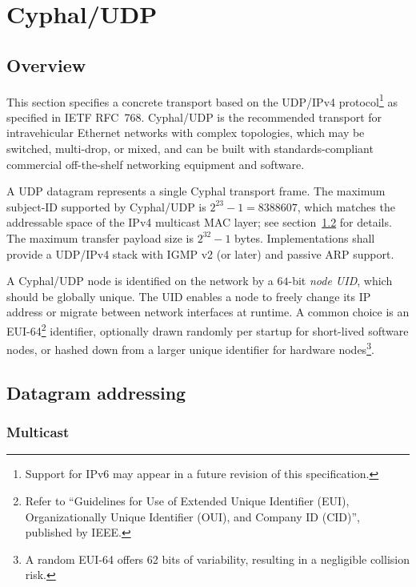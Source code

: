 \section{Cyphal/UDP}\label{sec:transport_udp}

\subsection{Overview}

This section specifies a concrete transport based on the UDP/IPv4 protocol\footnote{%
    Support for IPv6 may appear in a future revision of this specification.
} as specified in IETF RFC~768.
Cyphal/UDP is the recommended transport for intravehicular Ethernet networks with complex topologies,
which may be switched, multi-drop, or mixed, and can be built with standards-compliant commercial
off-the-shelf networking equipment and software.

A UDP datagram represents a single Cyphal transport frame.
The maximum subject-ID supported by Cyphal/UDP is $2^{23}-1 = 8388607$, which matches the addressable space
of the IPv4 multicast MAC layer; see section~\ref{sec:transport_udp_endpoints} for details.
The maximum transfer payload size is $2^{32}-1$ bytes.
Implementations shall provide a UDP/IPv4 stack with IGMP v2 (or later) and passive ARP support.

A Cyphal/UDP node is identified on the network by a $64$-bit \emph{node UID}, which should be globally unique.
The UID enables a node to freely change its IP address or migrate between network interfaces at runtime.
A common choice is an EUI-64\footnote{%
    Refer to ``Guidelines for Use of Extended Unique Identifier (EUI), Organizationally Unique Identifier (OUI),
    and Company ID (CID)'', published by IEEE.
} identifier, optionally drawn randomly per startup for short-lived software nodes,
or hashed down from a larger unique identifier for hardware nodes\footnote{%
    A random EUI-64 offers 62 bits of variability, resulting in a negligible collision risk.
}.

\subsection{Datagram addressing}\label{sec:transport_udp_endpoints}

\subsubsection{Multicast}

